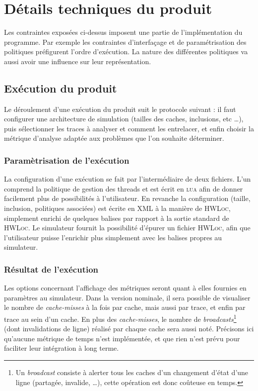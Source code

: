 \section{Détails techniques du produit}

Les contraintes exposées ci-dessus imposent une partie de l'implémentation du programme. Par exemple les contraintes d'interfaçage et de paramétrisation des politiques préfigurent l'ordre d'exécution. La nature des différentes politiques va aussi avoir une influence sur leur représentation.

\subsection{Exécution du produit}

Le déroulement d'une exécution du produit suit le protocole suivant : il faut configurer une architecture de simulation (tailles des caches, inclusions, etc \ldots), puis sélectionner les traces à analyser et comment les entrelacer, et enfin choisir la métrique d'analyse adaptée aux problèmes que l'on souhaite déterminer.

\subsubsection{Paramètrisation de l'exécution}

La configuration d'une exécution se fait par l'intermédiaire de deux fichiers. L'un comprend la politique de gestion des threads et est écrit en \textsc{lua} afin de donner facilement plus de possibilités à l'utilisateur. En revanche la configuration (taille, inclusion, politiques associées) est écrite en \textsc{XML} à la manière de \textsc{HWLoc}, simplement enrichi de quelques balises par rapport à la sortie standard de \textsc{HWLoc}. Le simulateur fournit la possibilité d'épurer un fichier \textsc{HWLoc}, afin que l'utilisateur puisse l'enrichir plus simplement avec les balises propres au simulateur.

\subsubsection{Résultat de l'exécution}
\label{métriques}

Les options concernant l'affichage des métriques seront quant à elles fournies en paramètres au simulateur. Dans la version nominale, il sera possible de visualiser le nombre de \emph{cache-misses} à la fois par cache, mais aussi par trace, et enfin par trace au sein d'un cache. En plus des \emph{cache-misses}, le nombre de \emph{broadcasts}\footnote{Un \emph{broadcast} consiste à alerter tous les caches d'un changement d'état d'une ligne (partagée, invalide, \ldots), cette opération est donc coûteuse en temps.} (dont invalidations de ligne) réalisé par chaque cache sera aussi noté. Précisons ici qu'aucune métrique de temps n'est implémentée, et que rien n'est prévu pour faciliter leur intégration à long terme.

